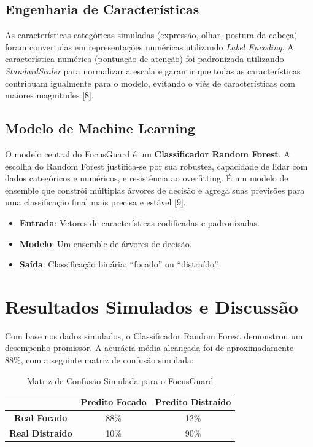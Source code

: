 \documentclass{article}
\begin{document}
\subsection{Engenharia de Características}

As características categóricas simuladas (expressão, olhar, postura da cabeça) foram convertidas em representações numéricas utilizando \textit{Label Encoding}. A característica numérica (pontuação de atenção) foi padronizada utilizando \textit{StandardScaler} para normalizar a escala e garantir que todas as características contribuam igualmente para o modelo, evitando o viés de características com maiores magnitudes [8].

\subsection{Modelo de Machine Learning}

O modelo central do FocusGuard é um \textbf{Classificador Random Forest}. A escolha do Random Forest justifica-se por sua robustez, capacidade de lidar com dados categóricos e numéricos, e resistência ao overfitting. É um modelo de ensemble que constrói múltiplas árvores de decisão e agrega suas previsões para uma classificação final mais precisa e estável [9].

\begin{itemize}
    \item \textbf{Entrada}: Vetores de características codificadas e padronizadas.
    \item \textbf{Modelo}: Um ensemble de árvores de decisão.
    \item \textbf{Saída}: Classificação binária: ``focado'' ou ``distraído''.
\end{itemize}

\section{Resultados Simulados e Discussão}

Com base nos dados simulados, o Classificador Random Forest demonstrou um desempenho promissor. A acurácia média alcançada foi de aproximadamente 88\%, com a seguinte matriz de confusão simulada:

\begin{table}[h!]
    \centering
    \caption{Matriz de Confusão Simulada para o FocusGuard}
    \begin{tabular}{|c|c|c|}
        \hline
        & \textbf{Predito Focado} & \textbf{Predito Distraído} \\
        \hline
        \textbf{Real Focado} & 88\% & 12\% \\
        \textbf{Real Distraído} & 10\% & 90\% \\
        \hline
    \end{tabular}
    \label{tab:confusion_matrix}
\end{table}
\end{document}

